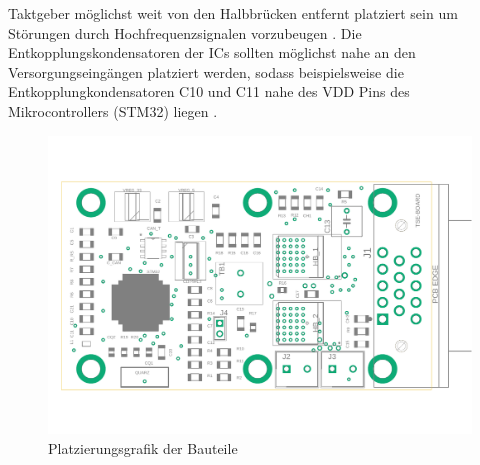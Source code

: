 Taktgeber möglichst weit von den Halbbrücken entfernt platziert sein um Störungen durch Hochfrequenzsignalen vorzubeugen \cite[S.31]{stmquarz}.
Die Entkopplungskondensatoren der ICs sollten möglichst nahe an den Versorgungseingängen platziert werden, sodass beispielsweise die Entkopplungkondensatoren C10 und C11 nahe des VDD Pins des Mikrocontrollers (STM32) liegen \cite[S.17]{emcdes}.

\begin{figure}[H]%
\centering
\includegraphics[width=380pt]{./Bilder/docu}%
\caption{Platzierungsgrafik der Bauteile}%
\label{fig:docu}%
\end{figure}


